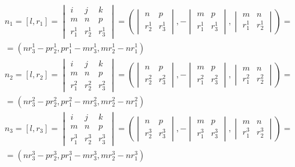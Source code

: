 $$\begin{gathered}
	n_1 = [l, r_1] = \begin{vmatrix}
		i & j & k \\
		m & n & p \\
		r_1^1 & r_2^1 & r_3^1
	\end{vmatrix} = \left( \begin{vmatrix}
		n & p \\
		r_2^1 & r_3^1
	\end{vmatrix}, -\begin{vmatrix}
		m & p \\
		r_1^1 & r_3^1
	\end{vmatrix}, \begin{vmatrix}
		m & n \\
		r_1^1 & r_2^1
	\end{vmatrix} \right) = \\
	= \left( n r_3^1 - p r_2^1, p r_1^1 - m r_3^1, m r_2^1 - n r_1^1 \right)
\end{gathered}$$
$$\begin{gathered}
	n_2 = [l, r_2] = \begin{vmatrix}
		i & j & k \\
		m & n & p \\
		r_1^2 & r_2^2 & r_3^2
	\end{vmatrix} = \left( \begin{vmatrix}
		n & p \\
		r_2^2 & r_3^2
	\end{vmatrix}, -\begin{vmatrix}
		m & p \\
		r_1^2 & r_3^2
	\end{vmatrix}, \begin{vmatrix}
		m & n \\
		r_1^2 & r_2^2
	\end{vmatrix} \right) = \\
	= \left( n r_3^2 - p r_2^2, p r_1^2 - m r_3^2, m r_2^2 - n r_1^2 \right)
\end{gathered}$$
$$\begin{gathered}
	n_3 = [l, r_3] = \begin{vmatrix}
		i & j & k \\
		m & n & p \\
		r_1^3 & r_2^3 & r_3^3
	\end{vmatrix} = \left( \begin{vmatrix}
		n & p \\
		r_2^3 & r_3^3
	\end{vmatrix}, -\begin{vmatrix}
		m & p \\
		r_1^3 & r_3^3
	\end{vmatrix}, \begin{vmatrix}
		m & n \\
		r_1^3 & r_2^3
	\end{vmatrix} \right) = \\
	= \left( n r_3^3 - p r_2^3, p r_1^3 - m r_3^3, m r_2^3 - n r_1^3 \right)
\end{gathered}$$

